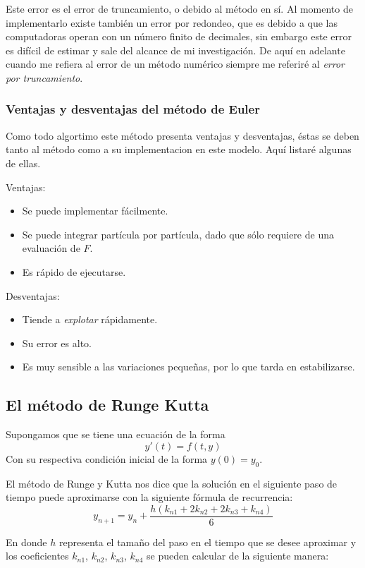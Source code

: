 Este error es el error de truncamiento, o debido al método en sí. Al momento de implementarlo existe también un error por redondeo, que es debido a que las computadoras operan con un número finito de decimales, sin embargo este error es difícil de estimar y sale del alcance de mi investigación. De aquí en adelante cuando me refiera al error de un método numérico siempre me referiré al \emph{error por truncamiento}.

\subsubsection{Ventajas y desventajas del método de Euler}

Como todo algortimo este método presenta ventajas y desventajas, éstas se deben tanto al método como a su implementacion en este modelo. Aquí listaré algunas de ellas.

Ventajas:
\begin{itemize}
\item Se puede implementar fácilmente.
\item Se puede integrar partícula por partícula, dado que sólo requiere de una evaluación de $F$.
\item Es rápido de ejecutarse.
\end{itemize}

Desventajas:
\begin{itemize}
\item Tiende a \emph{explotar} rápidamente.
\item Su error es alto.
\item Es muy sensible a las variaciones pequeñas, por lo que tarda en estabilizarse.
\end{itemize}

\subsection{El método de Runge Kutta}
Supongamos que se tiene una ecuación de la forma
$$y'(t) = f(t, y)$$
Con su respectiva condición inicial de la forma $y(0)=y_0$.

El método de Runge y Kutta nos dice que la solución en el siguiente paso de tiempo puede aproximarse con la siguiente fórmula de recurrencia:
$$y_{n+1} = y_n + \frac{h \left(k_{n1} + 2k_{n2} + 2k_{n3} + k_{n4} \right)}{6} $$
 
En donde $h$ representa el tamaño del paso en el tiempo que se desee aproximar y los coeficientes $k_{n1}$, $k_{n2}$, $k_{n3}$, $k_{n4}$ se pueden calcular de la siguiente manera:

